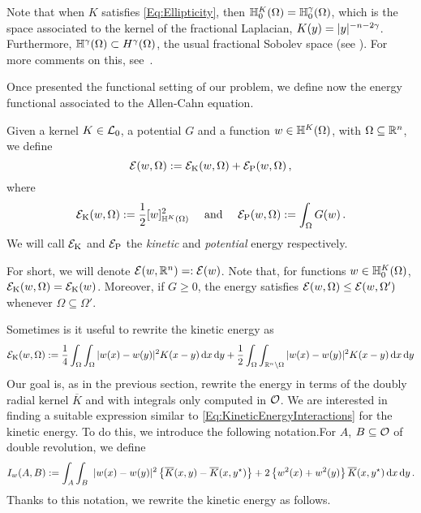 Note that when $K$ satisfies \eqref{Eq:Ellipticity}, then $\mathbb{H}^K_0 (\Omega) = \mathbb{H}^\gamma_0 (\Omega)$,
which is the space associated to the kernel of the fractional Laplacian, $K(y) = |y|^{-n-2\gamma}$.
Furthermore, $\mathbb{H}^\gamma(\Omega) \subset H^\gamma(\Omega)$, the usual fractional Sobolev space (see
\cite{HitchhikerGuide}).  For more comments on this, see~\cite{CozziPassalacqua}.

Once presented the functional setting of our problem, we define now  the energy functional associated to the Allen-Cahn equation. 

\begin{definition}
	Given a kernel $K \in \mathcal{L}_0$, a potential $G$ and a function $w\in \mathbb{H}^K(\Omega)$, with $\Omega\subseteq \mathbb{R}^{n}$, we define
	$$
	\mathcal{E}(w, \Omega) := \mathcal{E}_\mathrm{K}(w,\Omega) + \mathcal{E}_\mathrm{P}(w,\Omega)\,,
	$$
	where
	$$
	\mathcal{E}_\mathrm{K}(w, \Omega) := \dfrac{1}{2} [w]^2_{\mathbb{H}^K(\Omega)} \quad \text{ and } \quad  \mathcal{E}_\mathrm{P}(w, \Omega) := \int_{\Omega} G(w)
	\,.
	$$
	We will call $\mathcal{E}_\mathrm{K}$ and $\mathcal{E}_\mathrm{P}$ the \emph{kinetic} and \emph{potential} energy respectively.
\end{definition}


For short, we will denote $\mathcal{E}(w, \mathbb{R}^n) =: \mathcal{E}(w)$. Note that, for functions $w\in \mathbb{H}^K_0(\Omega)$, $\mathcal{E}_\mathrm{K}(w,\Omega) = \mathcal{E}_\mathrm{K}(w)$. Moreover, if $G\geq 0$, the energy satisfies $
\mathcal{E}(w, \Omega) \leq \mathcal{E}(w, \Omega')$  whenever $ \Omega \subseteq \Omega'$.

Sometimes is it useful to rewrite the kinetic energy as
\begin{equation}
	\label{Eq:KineticEnergyInteractions}
	\mathcal{E}_\mathrm{K}(w, \Omega) := \dfrac{1}{4} \int_\Omega \int_\Omega |w(x) - w(y)|^2 K(x-y) \,\mathrm{d} x \,\mathrm{d} y + \dfrac{1}{2} \int_\Omega \int_{\mathbb{R}^n \setminus \Omega} |w(x) - w(y)|^2 K(x-y) \,\mathrm{d} x \,\mathrm{d} y	
\end{equation}
Our goal is, as in the previous section, rewrite the energy in terms of the doubly radial kernel $\overline{K}$ and with integrals only computed in $\mathcal{O}$. We are interested in finding a suitable expression similar to \eqref{Eq:KineticEnergyInteractions} for the kinetic energy. To do this, we introduce the following notation.For $A$, $B\subseteq \mathcal{O}$ of double revolution, we define
$$
I_w(A,B) := \int_A  \int_B  \ |w(x)-w(y)|^2 \left\{ \overline{K}(x,y) - \overline{K}(x,y^\star) \right\}  +2 \left\{w^2(x)+w^2(y)\right\} \overline{K}(x,y^\star) \,\mathrm{d} x \,\mathrm{d} y\,.
$$
Thanks to this notation, we rewrite the kinetic energy as follows.


